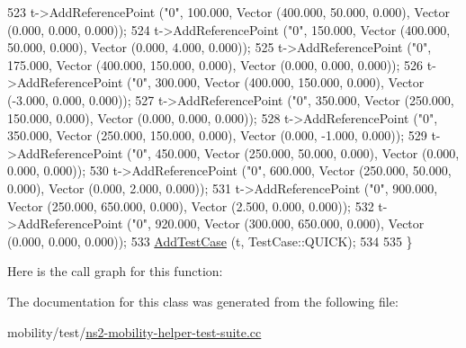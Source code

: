 \begin{DoxyCode}
523     t->AddReferencePoint (\textcolor{stringliteral}{"0"}, 100.000, Vector (400.000, 50.000, 0.000), Vector (0.000, 0.000, 0.000));
524     t->AddReferencePoint (\textcolor{stringliteral}{"0"}, 150.000, Vector (400.000, 50.000, 0.000), Vector (0.000, 4.000, 0.000));
525     t->AddReferencePoint (\textcolor{stringliteral}{"0"}, 175.000, Vector (400.000, 150.000, 0.000), Vector (0.000, 0.000, 0.000));
526     t->AddReferencePoint (\textcolor{stringliteral}{"0"}, 300.000, Vector (400.000, 150.000, 0.000), Vector (-3.000, 0.000, 0.000));
527     t->AddReferencePoint (\textcolor{stringliteral}{"0"}, 350.000, Vector (250.000, 150.000, 0.000), Vector (0.000, 0.000, 0.000));
528     t->AddReferencePoint (\textcolor{stringliteral}{"0"}, 350.000, Vector (250.000, 150.000, 0.000), Vector (0.000, -1.000, 0.000));
529     t->AddReferencePoint (\textcolor{stringliteral}{"0"}, 450.000, Vector (250.000,  50.000, 0.000), Vector (0.000, 0.000, 0.000));
530     t->AddReferencePoint (\textcolor{stringliteral}{"0"}, 600.000, Vector (250.000,  50.000, 0.000), Vector (0.000, 2.000, 0.000));
531     t->AddReferencePoint (\textcolor{stringliteral}{"0"}, 900.000, Vector (250.000,  650.000, 0.000), Vector (2.500, 0.000, 0.000));
532     t->AddReferencePoint (\textcolor{stringliteral}{"0"}, 920.000, Vector (300.000,  650.000, 0.000), Vector (0.000, 0.000, 0.000));
533     \hyperlink{classns3_1_1TestCase_a3718088e3eefd5d6454569d2e0ddd835}{AddTestCase} (t, TestCase::QUICK);
534 
535   \}
\end{DoxyCode}


Here is the call graph for this function\+:




The documentation for this class was generated from the following file\+:\begin{DoxyCompactItemize}
\item 
mobility/test/\hyperlink{ns2-mobility-helper-test-suite_8cc}{ns2-\/mobility-\/helper-\/test-\/suite.\+cc}\end{DoxyCompactItemize}

